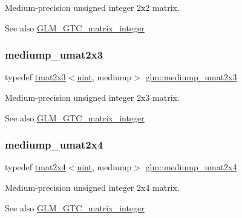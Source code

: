 Medium-\/precision unsigned integer 2x2 matrix. \begin{DoxySeeAlso}{See also}
\hyperlink{group__gtc__matrix__integer}{G\+L\+M\+\_\+\+G\+T\+C\+\_\+matrix\+\_\+integer} 
\end{DoxySeeAlso}
\mbox{\label{group__gtc__matrix__integer_ga23dfc19249ad27dc4b02615f1d045ba1}} 
\subsubsection{\texorpdfstring{mediump\+\_\+umat2x3}{mediump\_umat2x3}}
{\footnotesize\ttfamily typedef \hyperlink{structglm_1_1tmat2x3}{tmat2x3}$<$\hyperlink{group__core__precision_ga4fd29415871152bfb5abd588334147c8}{uint}, mediump$>$ \hyperlink{group__gtc__matrix__integer_ga23dfc19249ad27dc4b02615f1d045ba1}{glm\+::mediump\+\_\+umat2x3}}

Medium-\/precision unsigned integer 2x3 matrix. \begin{DoxySeeAlso}{See also}
\hyperlink{group__gtc__matrix__integer}{G\+L\+M\+\_\+\+G\+T\+C\+\_\+matrix\+\_\+integer} 
\end{DoxySeeAlso}
\mbox{\label{group__gtc__matrix__integer_ga972445669c6e6652716f3f0b664b94cd}} 
\subsubsection{\texorpdfstring{mediump\+\_\+umat2x4}{mediump\_umat2x4}}
{\footnotesize\ttfamily typedef \hyperlink{structglm_1_1tmat2x4}{tmat2x4}$<$\hyperlink{group__core__precision_ga4fd29415871152bfb5abd588334147c8}{uint}, mediump$>$ \hyperlink{group__gtc__matrix__integer_ga972445669c6e6652716f3f0b664b94cd}{glm\+::mediump\+\_\+umat2x4}}

Medium-\/precision unsigned integer 2x4 matrix. \begin{DoxySeeAlso}{See also}
\hyperlink{group__gtc__matrix__integer}{G\+L\+M\+\_\+\+G\+T\+C\+\_\+matrix\+\_\+integer} 
\end{DoxySeeAlso}
\mbox{\label{group__gtc__matrix__integer_ga953d4cb3e70d85567756b3fbcca0e9e9}} 
